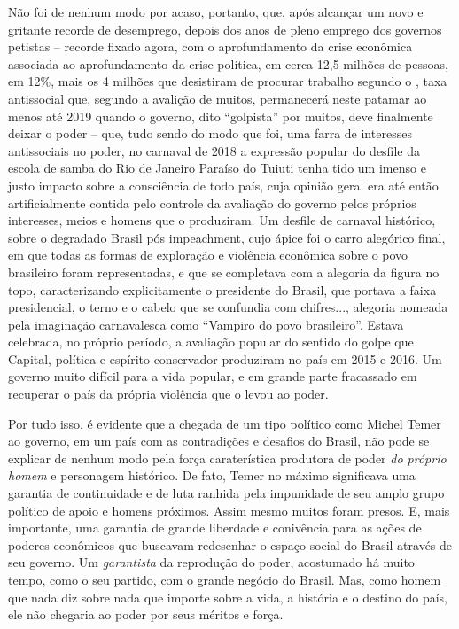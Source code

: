 Não foi de nenhum modo por acaso, portanto, que, após alcançar um novo e
gritante recorde de desemprego, depois dos anos de pleno emprego dos
governos petistas -- recorde fixado agora, com o aprofundamento da crise
econômica associada ao aprofundamento da crise política, em cerca 12,5 milhões
de pessoas, em 12\%, mais os 4 milhões que desistiram de procurar
trabalho segundo o , taxa antissocial que, segundo a avalição de
muitos, permanecerá neste patamar ao menos até 2019 quando o governo,
dito ``golpista'' por muitos, deve finalmente deixar o poder -- que,
tudo sendo do modo que foi, uma farra de interesses antissociais no
poder, no carnaval de 2018 a expressão popular do desfile da escola de
samba do Rio de Janeiro Paraíso do Tuiuti tenha tido um imenso e justo
impacto sobre a consciência de todo país, cuja opinião geral era até
então artificialmente contida pelo controle da avaliação do governo
pelos próprios interesses, meios e homens que o produziram. Um desfile
de carnaval histórico, sobre o degradado Brasil pós impeachment, cujo
ápice foi o carro alegórico final, em que todas as formas de exploração
e violência econômica sobre o povo brasileiro foram representadas, e que
se completava com a alegoria da figura no topo, caracterizando
explicitamente o presidente do Brasil, que portava a faixa presidencial,
o terno e o cabelo que se confundia com chifres..., alegoria nomeada
pela imaginação carnavalesca como ``Vampiro do povo brasileiro''. Estava
celebrada, no próprio período, a avaliação popular do sentido do golpe
que Capital, política e espírito conservador produziram no país em 2015
e 2016. Um governo muito difícil para a vida popular, e em grande parte
fracassado em recuperar o país da própria violência que o levou ao
poder.

Por tudo isso, é evidente que a chegada de um tipo político como Michel
Temer ao governo, em um país com as contradições e desafios do Brasil,
não pode se explicar de nenhum modo pela força caraterística produtora
de poder \emph{do próprio homem} e personagem histórico. De fato, Temer
no máximo significava uma garantia de continuidade e de luta ranhida
pela impunidade de seu amplo grupo político de apoio e homens próximos.
Assim mesmo muitos foram presos. E, mais importante, uma garantia de
grande liberdade e conivência para as ações de poderes econômicos que
buscavam redesenhar o espaço social do Brasil através de seu governo. Um
\emph{garantista} da reprodução do poder, acostumado há muito tempo,
como o seu partido, com o grande negócio do Brasil. Mas, como homem que
nada diz sobre nada que importe sobre a vida, a história e o destino do
país, ele não chegaria ao poder por seus méritos e força.

